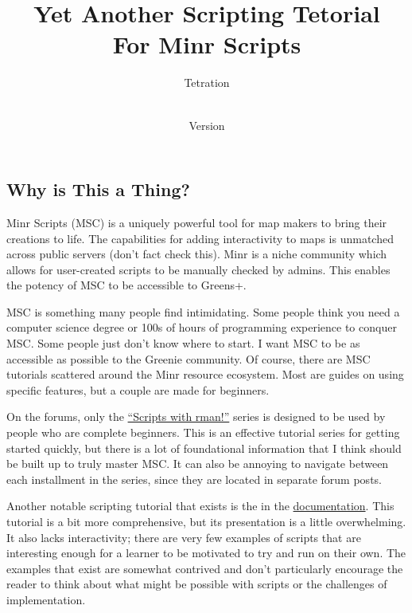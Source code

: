 \documentclass[oneside]{book}
\begin{document}
\pagestyle{empty}

\title{Yet Another Scripting Tetorial \\
        \large For Minr Scripts \mscv}
\author{Tetration}
\date{\vhCurrentDate \\Version \vhCurrentVersion}
\maketitle


\frontmatter
{} 

\begin{preface}
\section*{Why is This a Thing?}
Minr Scripts (MSC) is a uniquely powerful tool for map makers to bring their creations to life. The capabilities for adding interactivity to maps is unmatched across public servers (don't fact check this). Minr is a niche community which allows for user-created scripts to be manually checked by admins. This enables the potency of MSC to be accessible to Greens+.

MSC is something many people find intimidating. Some people think you need a computer science degree or 100s of hours of programming experience to conquer MSC. Some people just don't know where to start. I want MSC to be as accessible as possible to the Greenie community. Of course, there are MSC tutorials scattered around the Minr resource ecosystem. Most are guides on using specific features, but a couple are made for beginners.

On the forums, only the \href{https://forums.minr.org/threads/scripts-with-rman-1-basic-script-understanding.3193/}{``Scripts with rman!''} series is designed to be used by people who are complete beginners. This is an effective tutorial series for getting started quickly, but there is a lot of foundational information that I think should be built up to truly master MSC. It can also be annoying to navigate between each installment in the series, since they are located in separate forum posts.

Another notable scripting tutorial that exists is the in the \href{https://msc-documentation.readthedocs.io/en/latest/tutorial.html}{documentation}. This tutorial is a bit more comprehensive, but its presentation is a little overwhelming. It also lacks interactivity; there are very few examples of scripts that are interesting enough for a learner to be motivated to try and run on their own. The examples that exist are somewhat contrived and don't particularly encourage the reader to think about what might be possible with scripts or the challenges of implementation.


\end{preface}
\end{document}

